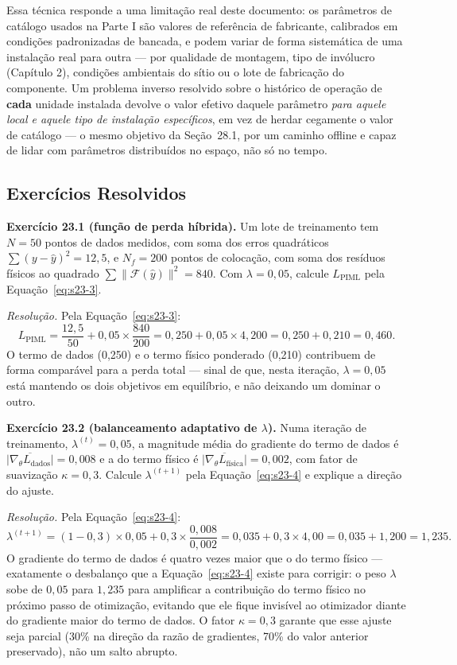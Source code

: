 \documentclass[12pt,a4paper]{article}
\numberwithin{equation}{section}
\numberwithin{table}{section}
\numberwithin{figure}{section}
\begin{document}
	Essa técnica responde a uma limitação real deste documento: os parâmetros de catálogo usados na Parte I são valores de referência de fabricante, calibrados em condições padronizadas de bancada, e podem variar de forma sistemática de uma instalação real para outra — por qualidade de montagem, tipo de invólucro (Capítulo 2), condições ambientais do sítio ou o lote de fabricação do componente. Um problema inverso resolvido sobre o histórico de operação de \textbf{cada} unidade instalada devolve o valor efetivo daquele parâmetro \textit{para aquele local e aquele tipo de instalação específicos}, em vez de herdar cegamente o valor de catálogo — o mesmo objetivo da Seção~28.1, por um caminho offline e capaz de lidar com parâmetros distribuídos no espaço, não só no tempo.

	\subsection{Exercícios Resolvidos}

	\textbf{Exercício 23.1 (função de perda híbrida).} Um lote de
	treinamento tem $N=50$ pontos de dados medidos, com soma dos erros
	quadráticos $\sum (y-\hat{y})^2 = 12{,}5$, e $N_f=200$ pontos de
	colocação, com soma dos resíduos físicos ao quadrado
	$\sum \| \mathcal{F}(\hat{y}) \|^2 = 840$. Com $\lambda=0{,}05$,
	calcule $L_{\text{PIML}}$ pela Equação~\eqref{eq:s23-3}.

	\emph{Resolução.} Pela Equação~\eqref{eq:s23-3}:
	$$L_{\text{PIML}} = \frac{12{,}5}{50} + 0{,}05 \times \frac{840}{200}
	= 0{,}250 + 0{,}05 \times 4{,}200 = 0{,}250 + 0{,}210 = 0{,}460.$$
	O termo de dados (0,250) e o termo físico ponderado (0,210)
	contribuem de forma comparável para a perda total --- sinal de que,
	nesta iteração, $\lambda=0{,}05$ está mantendo os dois objetivos em
	equilíbrio, e não deixando um dominar o outro.

	\textbf{Exercício 23.2 (balanceamento adaptativo de $\lambda$).} Numa
	iteração de treinamento, $\lambda^{(t)}=0{,}05$, a magnitude média do
	gradiente do termo de dados é $\overline{|\nabla_\theta
	L_{\text{dados}}|}=0{,}008$ e a do termo físico é
	$\overline{|\nabla_\theta L_{\text{física}}|}=0{,}002$, com fator de
	suavização $\kappa=0{,}3$. Calcule $\lambda^{(t+1)}$ pela
	Equação~\eqref{eq:s23-4} e explique a direção do ajuste.

	\emph{Resolução.} Pela Equação~\eqref{eq:s23-4}:
	$$\lambda^{(t+1)} = (1-0{,}3)\times 0{,}05 + 0{,}3 \times
	\frac{0{,}008}{0{,}002} = 0{,}035 + 0{,}3 \times 4{,}00 = 0{,}035 +
	1{,}200 = 1{,}235.$$
	O gradiente do termo de dados é quatro vezes maior que o do termo
	físico --- exatamente o desbalanço que a Equação~\eqref{eq:s23-4}
	existe para corrigir: o peso $\lambda$ sobe de $0{,}05$ para
	$1{,}235$ para amplificar a contribuição do termo físico no próximo
	passo de otimização, evitando que ele fique invisível ao otimizador
	diante do gradiente maior do termo de dados. O fator $\kappa=0{,}3$
	garante que esse ajuste seja parcial (30\% na direção da razão de
	gradientes, 70\% do valor anterior preservado), não um salto abrupto.
\end{document}
